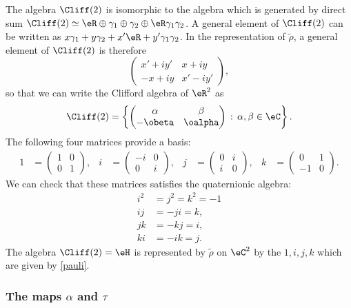 The algebra $\Cliff(2)$ is isomorphic to the algebra which is generated by direct sum $\Cliff(2)\simeq\eR\oplus\gamma_1\oplus\gamma_2\oplus\eR\gamma_1\gamma_2$. A general element of $\Cliff(2)$ can be written as $x\gamma_1+y\gamma_2+x'\eR+y'\gamma_1\gamma_2$. In the representation of $\tilde\rho$, a general element of $\Cliff(2)$ is therefore
\[\begin{pmatrix}
x'+iy' & x+iy \\
-x+iy & x'-iy'
\end{pmatrix},\] so that we can write the Clifford algebra of $\eR^2$ as
\[
\Cliff(2)=\left\{\begin{pmatrix}
 \alpha & \beta \\
 -\obeta & \oalpha
 \end{pmatrix}\,:\,\alpha,\beta\in\eC\right\}.
\]
The following four matrices provide a basis:
\begin{align}\label{pauli} 
1&=\begin{pmatrix}
1 & 0 \\
0 & 1
\end{pmatrix}, &i&=\begin{pmatrix}
-i & 0 \\
0 & i
\end{pmatrix},&j&=\begin{pmatrix}
0 & i \\
i & 0
\end{pmatrix},&k&=\begin{pmatrix}
0 & 1 \\
-1 & 0
\end{pmatrix}.
\end{align}
We can check that these matrices satisfies the quaternionic algebra:
\begin{equation}
\begin{split}
i^2&=j^2=k^2=-1\\
ij &=-ji=k,\\
jk &=-kj=i,\\
ki &=-ik=j.
\end{split}
\end{equation}
The algebra $\Cliff(2)=\eH$ is represented by $\tilde\rho$ on $\eC^2$ by the  $1,i,j,k$ which are given by \eqref{pauli}.

\subsubsection{The maps \texorpdfstring{$\alpha$}{a} and \texorpdfstring{$\tau$}{t}}

